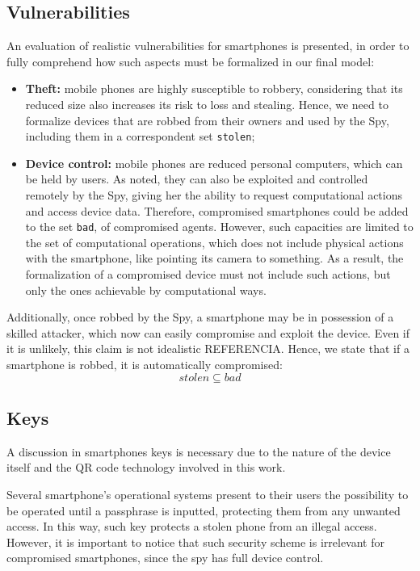 \subsection{Vulnerabilities}
An evaluation of realistic vulnerabilities for smartphones is presented, in order to fully comprehend how such aspects must be formalized in our final model:

\begin{itemize}
  \item \textbf{Theft:} mobile phones are highly susceptible to robbery, considering that its reduced size also increases its risk to loss and stealing. Hence, we need to formalize devices that are robbed from their owners and used by the Spy, including them in a correspondent set \texttt{stolen};

  \item \textbf{Device control:} mobile phones are reduced personal computers, which can be held by users. As noted, they can also be exploited and controlled remotely by the Spy, giving her the ability to request computational actions and access device data. Therefore, compromised smartphones could be added to the set \texttt{bad}, of compromised agents. However, such capacities are limited to the set of computational operations, which does not include physical actions with the smartphone, like pointing its camera to something. As a result, the formalization of a compromised device must not include such actions, but only the ones achievable by computational ways.
\end{itemize}

Additionally, once robbed by the Spy, a smartphone may be in possession of a skilled attacker, which now can easily compromise and exploit the device. Even if it is unlikely, this claim is not idealistic {\color{blue} REFERENCIA}. Hence, we state that if a smartphone is robbed, it is automatically compromised:
%
$$stolen \subseteq bad$$


\subsection{Keys}
A discussion in smartphones keys is necessary due to the nature of the device itself and the QR code technology involved in this work.

Several smartphone's operational systems present to their users the possibility to be operated until a passphrase is inputted, protecting them from any unwanted access. In this way, such key protects a stolen phone from an illegal access. However, it is important to notice that such security scheme is irrelevant for compromised smartphones, since the spy has full device control.


